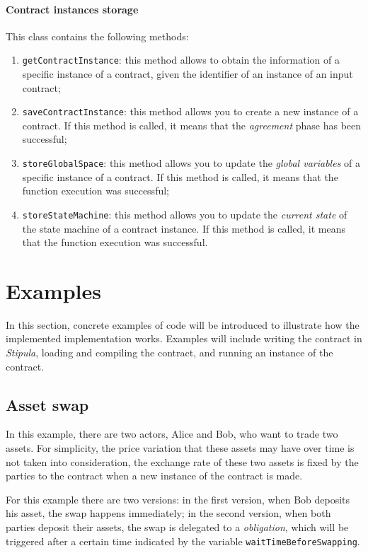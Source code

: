 \paragraph{Contract instances storage}

This class contains the following methods:
\begin{enumerate}
  \item \verb|getContractInstance|: this method allows to obtain the information of a specific instance of 
  a contract, given the identifier of an instance of an input contract;
  \item \verb|saveContractInstance|: this method allows you to create a new instance of a contract. If 
  this method is called, it means that the \textit{agreement} phase has been successful;
  \item \verb|storeGlobalSpace|: this method allows you to update the \textit{global variables} of a 
  specific instance of a contract. If this method is called, it means that the function execution was 
  successful;
  \item \verb|storeStateMachine|: this method allows you to update the \textit{current state} of the state 
  machine of a contract instance. If this method is called, it means that the function execution was 
  successful.
\end{enumerate}

\section{Examples}
\label{examples}

In this section, concrete examples of code will be introduced to illustrate how the implemented 
implementation works. Examples will include writing the contract in \textit{Stipula}, loading and 
compiling the contract, and running an instance of the contract.

\subsection{Asset swap}
\label{asset-swap}

In this example, there are two actors, Alice and Bob, who want to trade two assets. For simplicity, the 
price variation that these assets may have over time is not taken into consideration, the exchange rate of 
these two assets is fixed by the parties to the contract when a new instance of the contract is made.

For this example there are two versions: in the first version, when Bob deposits his asset, the swap 
happens immediately; in the second version, when both parties deposit their assets, the swap is delegated 
to a \textit{obligation}, which will be triggered after a certain time indicated by the variable 
\verb|waitTimeBeforeSwapping|.

